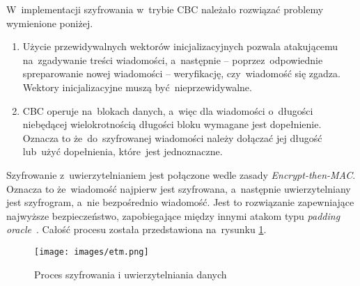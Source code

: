 W~implementacji szyfrowania w~trybie CBC należało rozwiązać problemy wymienione poniżej.

\begin{enumerate}
    \item Użycie przewidywalnych wektorów inicjalizacyjnych pozwala atakującemu na~zgadywanie treści wiadomości, a~następnie -- poprzez~odpowiednie spreparowanie nowej wiadomości -- weryfikację, czy~wiadomość się zgadza. Wektory inicjalizacyjne muszą być nieprzewidywalne.
    \item CBC operuje na~blokach danych, a~więc dla wiadomości o~długości niebędącej wielokrotnością długości bloku wymagane jest dopełnienie. Oznacza to że~do~szyfrowanej wiadomości należy dołączać jej długość lub~użyć dopełnienia, które~jest jednoznaczne.
\end{enumerate}

Szyfrowanie z~uwierzytelnianiem jest połączone wedle zasady {\itshape Encrypt-then-MAC}. Oznacza to że~wiadomość najpierw jest szyfrowana, a~następnie uwierzytelniany jest szyfrogram, a~nie bezpośrednio wiadomość. Jest to rozwiązanie zapewniające najwyższe bezpieczeństwo, zapobiegające między innymi atakom typu \emph{padding oracle}~\cite{black2011authenticated}. Całość procesu została przedstawiona na~rysunku \ref{fig:etm}.

\begin{figure}[ht]
\centering
\texttt{[image: images/etm.png]}
\caption{Proces szyfrowania i uwierzytelniania danych}
\label{fig:etm}
\end{figure}
